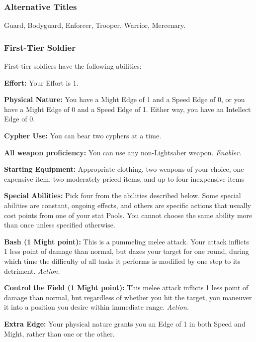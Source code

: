 \documentclass[a4paper,10pt,final,twocolumn,oneside]{book}
\newcommand{\itemLine}[2]{\textbf{#1:}{ #2}\par}
\newcommand{\itemAbility}[2]{\textcolor{25gray}{\textbullet\textbf{ #1:}}{ #2}\par}
\newcommand{\enabler}{\textit{ Enabler.}}
\newcommand{\action}{\textit{ Action.}}
\begin{document}
\subsubsection*{Alternative Titles}
\label{subsub:soldierAlternative}

Guard, Bodyguard, Enforcer, Trooper, Warrior, Mercenary.


\subsubsection*{First-Tier Soldier}
\label{subsub:soldierFirstTier}

First-tier soldiers have the following abilities:

\itemLine{Effort}{Your Effort is 1.}

\itemLine{Physical Nature}{You have a Might Edge
of 1 and a Speed Edge of 0, or you have a
Might Edge of 0 and a Speed Edge of 1.
Either way, you have an Intellect Edge of 0.}

\itemLine{Cypher Use}{You can bear two cyphers at a time.}

\itemLine{All weapon proficiency}{You can use any non-Lightsaber weapon.\enabler}

\itemLine{Starting Equipment}{Appropriate clothing, two weapons of your choice, one expensive item, two moderately priced items, and up to four inexpensive items}

\itemLine{Special Abilities}{Pick four from the abilities described below. Some special abilities are constant, ongoing effects, and others are specific actions that usually cost points from one of your stat Pools. You cannot choose the same ability more than once unless specified otherwise.}

\itemAbility{Bash (1 Might point)}{This is a pummeling melee attack. Your attack inflicts 1 less point of damage than normal, but dazes your target for one round, during which time the difficulty of all tasks it performs is modified by one step to its detriment.\action}

\itemAbility{Control the Field (1 Might point)}{This melee attack inflicts 1 less point of damage than normal, but regardless of whether you hit the target, you maneuver it into a position you desire within immediate range.\action}

\itemAbility{Extra Edge}{Your physical nature grants you an Edge of 1 in both Speed and Might, rather than one or the other.}
\end{document}
